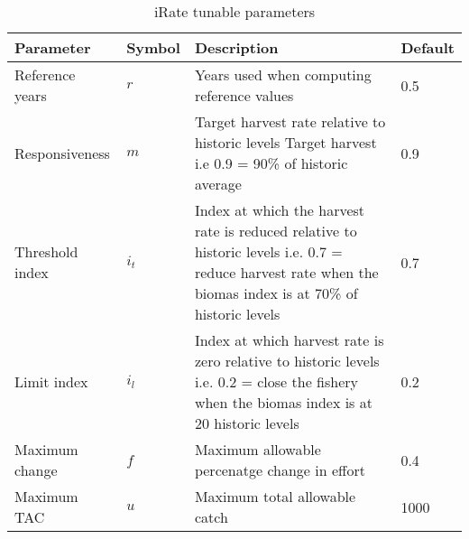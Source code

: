 \begin{table}[h]
\centering
\caption{iRate tunable parameters}
\begin{tabular}{p{3cm}p{1.2cm}p{6cm}p{2cm}} 
  \hline
  Parameter & Symbol & Description & Default \\ 
  \hline
  Reference years   &$r$&    Years used when computing reference values            & 0.5 \\
  Responsiveness    &$m$&    Target harvest rate relative to historic levels     
  Target harvest             i.e 0.9 = 90\% of historic average                    & 0.9 \\
  Threshold index   &$i_t$&  Index at which the harvest rate is reduced 
                             relative to historic levels i.e. 0.7 = 
                             reduce harvest rate when the biomas index is
                             at 70\% of historic levels                            & 0.7 \\ 
  Limit index       &$i_l$&  Index at which harvest rate is zero
			     relative to historic levels i.e. 0.2 = close the
			     fishery when the biomas index is at 20%
			     historic levels                                       & 0.2 \\ 
  Maximum change    &$f$&    Maximum allowable percenatge change in
                             effort                                                & 0.4 \\ 
  Maximum TAC       &$u$&    Maximum total allowable catch                         & 1000\\ 
  \hline
\end{tabular}
\end{table}
